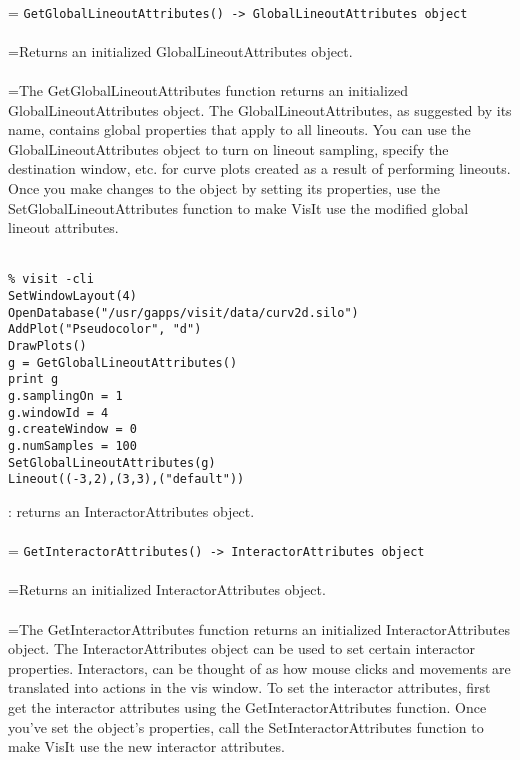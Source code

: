 \documentclass[10pt,a4paper]{report}
\begin{document}
 \\ 
\hangindent=\parindent 
\verb!GetGlobalLineoutAttributes() -> GlobalLineoutAttributes object!\\ [-3mm]

 \\ 
\hangindent=\parindent Returns an initialized GlobalLineoutAttributes object. \\[-3mm] 

 \\ 
\hangindent=\parindent The GetGlobalLineoutAttributes function returns an initialized GlobalLineoutAttributes object. The GlobalLineoutAttributes, as suggested by its name, contains global properties that apply to all lineouts. You can use the GlobalLineoutAttributes object to turn on lineout sampling, specify the destination window, etc. for curve plots created as a result of performing lineouts. Once you make changes to the object by setting its properties, use the SetGlobalLineoutAttributes function to make VisIt use the modified global lineout attributes. \\[-3mm] 

\\[-6mm]
\begin{verbatim}% visit -cli
SetWindowLayout(4)
OpenDatabase("/usr/gapps/visit/data/curv2d.silo")
AddPlot("Pseudocolor", "d")
DrawPlots()
g = GetGlobalLineoutAttributes()
print g
g.samplingOn = 1
g.windowId = 4
g.createWindow = 0
g.numSamples = 100
SetGlobalLineoutAttributes(g)
Lineout((-3,2),(3,3),("default"))
\end{verbatim}
\newpage


{}
: returns an InteractorAttributes object.\\[-3mm]

 \\ 
\hangindent=\parindent 
\verb!GetInteractorAttributes() -> InteractorAttributes object!\\ [-3mm]

 \\ 
\hangindent=\parindent Returns an initialized InteractorAttributes object. \\[-3mm] 

 \\ 
\hangindent=\parindent The GetInteractorAttributes function returns an initialized InteractorAttributes object. The InteractorAttributes object can be used to set certain interactor properties. Interactors, can be thought of as how mouse clicks and movements are translated into actions in the vis window. To set the interactor attributes, first get the interactor attributes using the GetInteractorAttributes function. Once you've set the object's properties, call the SetInteractorAttributes function to make VisIt use the new interactor attributes. \\[-3mm] 
\end{document}
